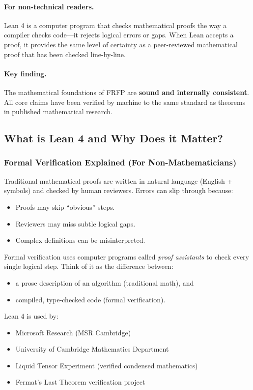 \paragraph{For non-technical readers.}
Lean 4 is a computer program that checks mathematical proofs the way a compiler checks code—it rejects logical errors or gaps. When Lean accepts a proof, it provides the same level of certainty as a peer-reviewed mathematical proof that has been checked line-by-line.

\paragraph{Key finding.}
The mathematical foundations of FRFP are \textbf{sound and internally consistent}. All core claims have been verified by machine to the same standard as theorems in published mathematical research.

\subsection{What is Lean 4 and Why Does it Matter?}

\subsubsection{Formal Verification Explained (For Non-Mathematicians)}
Traditional mathematical proofs are written in natural language (English + symbols) and checked by human reviewers. Errors can slip through because:
\begin{itemize}
  \item Proofs may skip ``obvious'' steps.
  \item Reviewers may miss subtle logical gaps.
  \item Complex definitions can be misinterpreted.
\end{itemize}

Formal verification uses computer programs called \emph{proof assistants} to check every single logical step. Think of it as the difference between:
\begin{itemize}
  \item a prose description of an algorithm (traditional math), and
  \item compiled, type-checked code (formal verification).
\end{itemize}

Lean 4 is used by:
\begin{itemize}
  \item Microsoft Research (MSR Cambridge)
  \item University of Cambridge Mathematics Department
  \item Liquid Tensor Experiment (verified condensed mathematics)
  \item Fermat's Last Theorem verification project
\end{itemize}


